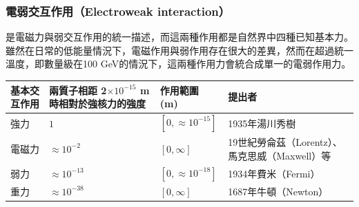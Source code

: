 \documentclass[a4paper,12pt]{article}
\begin{document}
\subsubsection{電弱交互作用（Electroweak interaction）}
是電磁力與弱交互作用的統一描述，而這兩種作用都是自然界中四種已知基本力。雖然在日常的低能量情況下，電磁作用與弱作用存在很大的差異，然而在超過統一溫度，即數量級在100 GeV的情況下，這兩種作用力會統合成單一的電弱作用力。
\begin{longtable}[c]{|p{}|p{}|p{}|p{}|}
\hline
基本交互作用 & 兩質子相距 2$\times 10^{-15}$ m 時相對於強核力的強度 & 作用範圍 (m) & 提出者\\\hline
強力 & $1$ & $[0, \approx 10^{-15}]$ & 1935年湯川秀樹\\\hline
電磁力 & $\approx 10^{-2}$ & $[0, \infty]$ & 19世紀勞侖茲（Lorentz）、馬克思威（Maxwell）等\\\hline
弱力 & $\approx 10^{-13}$ & $[0, \approx 10^{-18}]$ & 1934年費米（Fermi）\\\hline
重力 & $\approx 10^{-38}$ & $[0, \infty]$ & 1687年牛頓（Newton）\\\hline
\end{longtable}\FB
 
\end{document}
